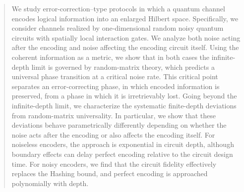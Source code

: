 \documentclass[aps,prl,twocolumn,superscriptaddress,numerical]{revtex4-2}
\begin{document}
\begin{abstract}
We study error-correction–type protocols in which a quantum channel encodes logical information into an enlarged Hilbert space. Specifically, we consider channels realized by one-dimensional random noisy quantum circuits with spatially local interaction gates. We analyze both noise acting after the encoding and noise affecting the encoding circuit itself. Using the coherent information as a metric, we show that in both cases the infinite-depth limit is governed by random-matrix theory, which predicts a universal phase transition at a critical noise rate. This critical point separates an error-correcting phase, in which encoded information is preserved, from a phase in which it is irretrievably lost. Going beyond the infinite-depth limit, we characterize the systematic finite-depth deviations from random-matrix universality. In particular, we show that these deviations behave parametrically differently depending on whether the noise acts after the encoding or also affects the encoding itself.
For noiseless encoders, the approach is exponential in circuit depth, although boundary effects can delay perfect encoding relative to the circuit design time. For noisy encoders, we find that the circuit fidelity effectively replaces the Hashing bound, and perfect encoding is approached polynomially with depth.
\end{abstract}

\maketitle
\end{document}
